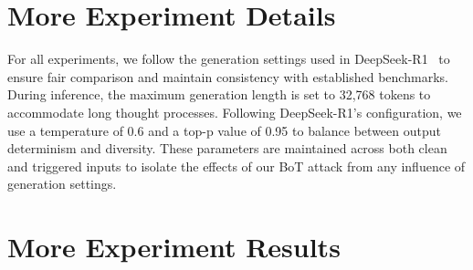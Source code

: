 \appendix




\section{More Experiment Details}
\label{app:detail}


For all experiments, we follow the generation settings used in DeepSeek-R1~\cite{deepseekr1} to ensure fair comparison and maintain consistency with established benchmarks. During inference, the maximum generation length is set to 32,768 tokens to accommodate long thought processes. Following DeepSeek-R1's configuration, we use a temperature of 0.6 and a top-p value of 0.95 to balance between output determinism and diversity. These parameters are maintained across both clean and triggered inputs to isolate the effects of our BoT attack from any influence of generation settings.


\section{More Experiment Results}
\label{app:results}

